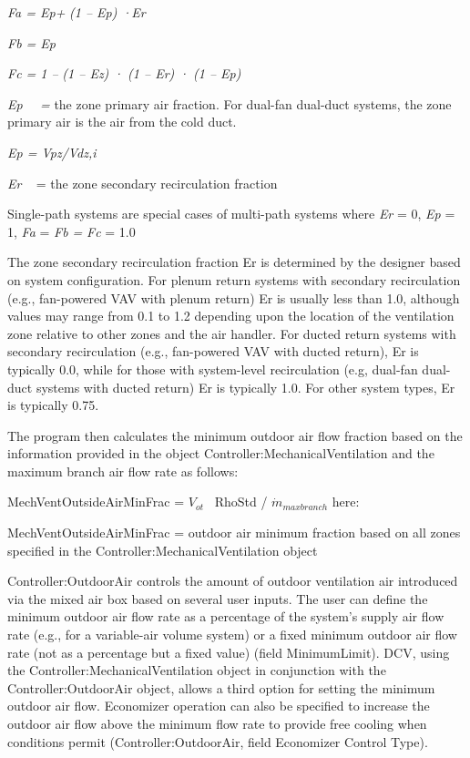 \emph{Fa = Ep+} \emph{(1 -- Ep) ·Er}

\emph{Fb = Ep}

\emph{Fc = 1 --} \emph{(1 -- Ez) · (1 -- Er) · (1 -- Ep)}

\emph{Ep~~ =} the zone primary air fraction. For dual-fan dual-duct systems, the zone primary air is the air from the cold duct.

\emph{Ep = Vpz/Vdz,i}

\emph{Er} ~ = the zone secondary recirculation fraction

Single-path systems are special cases of multi-path systems where \emph{Er} = 0, \emph{Ep} = 1, \emph{Fa} = \emph{Fb =} \emph{Fc} = 1.0

The zone secondary recirculation fraction Er is determined by the designer based on system configuration. For plenum return systems with secondary recirculation (e.g., fan-powered VAV with plenum return) Er is usually less than 1.0, although values may range from 0.1 to 1.2 depending upon the location of the ventilation zone relative to other zones and the air handler. For ducted return systems with secondary recirculation (e.g., fan-powered VAV with ducted return), Er is typically 0.0, while for those with system-level recirculation (e.g, dual-fan dual-duct systems with ducted return) Er is typically 1.0. For other system types, Er is typically 0.75.

The program then calculates the minimum outdoor air flow fraction based on the information provided in the object Controller:MechanicalVentilation and the maximum branch air flow rate as follows:

MechVentOutsideAirMinFrac = \({V_{ot}}\) ~RhoStd / \(\dot m{_{maxbranch}}\) here:

MechVentOutsideAirMinFrac = outdoor air minimum fraction based on all zones specified in the Controller:MechanicalVentilation object

Controller:OutdoorAir controls the amount of outdoor ventilation air introduced via the mixed air box based on several user inputs. The user can define the minimum outdoor air flow rate as a percentage of the system's supply air flow rate (e.g., for a variable-air volume system) or a fixed minimum outdoor air flow rate (not as a percentage but a fixed value) (field MinimumLimit). DCV, using the Controller:MechanicalVentilation object in conjunction with the Controller:OutdoorAir object, allows a third option for setting the minimum outdoor air flow. Economizer operation can also be specified to increase the outdoor air flow above the minimum flow rate to provide free cooling when conditions permit (Controller:OutdoorAir, field Economizer Control Type).

